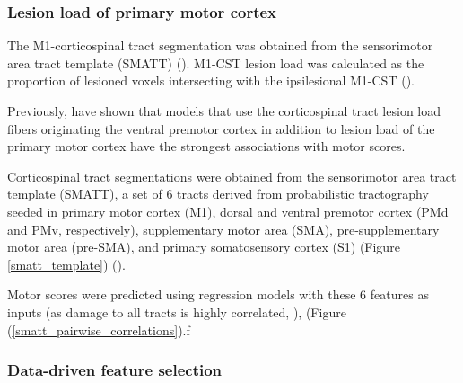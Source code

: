 \documentclass[10pt]{article}
\begin{document}
\subsubsection{Lesion load of primary motor cortex}
The M1-corticospinal tract segmentation was obtained from the sensorimotor area tract template (SMATT) (\cite{Archer2018-ti}). M1-CST lesion load was calculated as the proportion of lesioned voxels intersecting with the ipsilesional M1-CST (\cite{Zhu2010-qh}).



Previously, \cite{Ito2022-em} have shown that models that use the corticospinal tract lesion load fibers originating the ventral premotor cortex in addition to lesion load of the primary motor cortex have the strongest associations with motor scores.

Corticospinal tract segmentations were obtained from the sensorimotor area tract template (SMATT), a set of 6 tracts derived from probabilistic tractography seeded in primary motor cortex (M1), dorsal and ventral premotor cortex (PMd and PMv, respectively), supplementary motor area (SMA), pre-supplementary motor area (pre-SMA), and primary somatosensory cortex (S1) (Figure \ref{smatt_template}) (\cite{Archer2018-ti}).

Motor scores were predicted using regression models with these 6 features as inputs (as damage to all tracts is highly correlated, \cite{Ito2022-em}), (Figure (\ref{smatt_pairwise_correlations}).f

\subsubsection{Data-driven feature selection}
\end{document}

